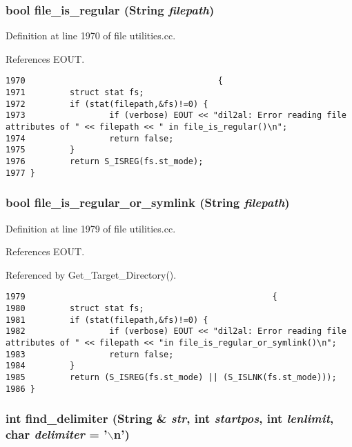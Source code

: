 \subsubsection{\setlength{\rightskip}{0pt plus 5cm}bool file\_\-is\_\-regular ({\bf String} {\em filepath})}\label{utilities_8cc_a32}




Definition at line 1970 of file utilities.cc.

References EOUT.



\footnotesize\begin{verbatim}1970                                       {
1971         struct stat fs;
1972         if (stat(filepath,&fs)!=0) {
1973                 if (verbose) EOUT << "dil2al: Error reading file attributes of " << filepath << " in file_is_regular()\n";
1974                 return false;
1975         }
1976         return S_ISREG(fs.st_mode);
1977 }
\end{verbatim}\normalsize 
{}
\subsubsection{\setlength{\rightskip}{0pt plus 5cm}bool file\_\-is\_\-regular\_\-or\_\-symlink ({\bf String} {\em filepath})}\label{utilities_8cc_a33}




Definition at line 1979 of file utilities.cc.

References EOUT.

Referenced by Get\_\-Target\_\-Directory().



\footnotesize\begin{verbatim}1979                                                  {
1980         struct stat fs;
1981         if (stat(filepath,&fs)!=0) {
1982                 if (verbose) EOUT << "dil2al: Error reading file attributes of " << filepath << "in file_is_regular_or_symlink()\n";
1983                 return false;
1984         }
1985         return (S_ISREG(fs.st_mode) || (S_ISLNK(fs.st_mode)));
1986 }
\end{verbatim}\normalsize 
{}
\subsubsection{\setlength{\rightskip}{0pt plus 5cm}int find\_\-delimiter ({\bf String} \& {\em str}, int {\em startpos}, int {\em lenlimit}, char {\em delimiter} = '$\backslash$n')\hspace{0.3cm}{\tt  [inline]}}\label{utilities_8cc_a43}




